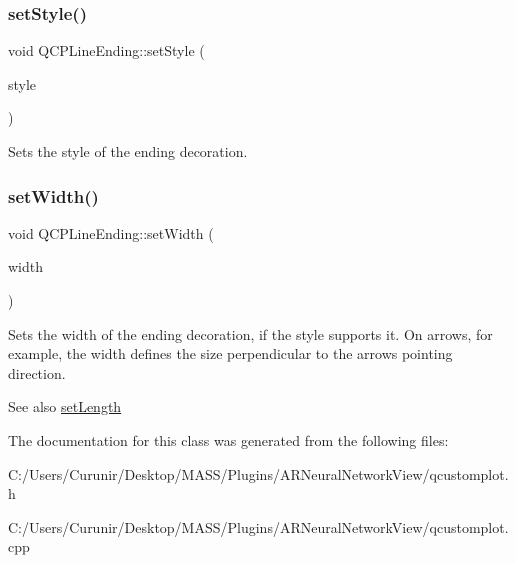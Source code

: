 \subsubsection{\texorpdfstring{set\+Style()}{setStyle()}}
{\footnotesize\ttfamily void Q\+C\+P\+Line\+Ending\+::set\+Style (\begin{DoxyParamCaption}\item[{\hyperlink{class_q_c_p_line_ending_a5ef16e6876b4b74959c7261d8d4c2cd5}{Q\+C\+P\+Line\+Ending\+::\+Ending\+Style}}]{style }\end{DoxyParamCaption})}

Sets the style of the ending decoration. \mbox{\label{class_q_c_p_line_ending_a26dc020ea985a72cc25881ce2115e34e}} 
\subsubsection{\texorpdfstring{set\+Width()}{setWidth()}}
{\footnotesize\ttfamily void Q\+C\+P\+Line\+Ending\+::set\+Width (\begin{DoxyParamCaption}\item[{double}]{width }\end{DoxyParamCaption})}

Sets the width of the ending decoration, if the style supports it. On arrows, for example, the width defines the size perpendicular to the arrow\textquotesingle{}s pointing direction.

\begin{DoxySeeAlso}{See also}
\hyperlink{class_q_c_p_line_ending_ae36fa01763751cd64b7f56c3507e935a}{set\+Length} 
\end{DoxySeeAlso}


The documentation for this class was generated from the following files\+:\begin{DoxyCompactItemize}
\item 
C\+:/\+Users/\+Curunir/\+Desktop/\+M\+A\+S\+S/\+Plugins/\+A\+R\+Neural\+Network\+View/qcustomplot.\+h\item 
C\+:/\+Users/\+Curunir/\+Desktop/\+M\+A\+S\+S/\+Plugins/\+A\+R\+Neural\+Network\+View/qcustomplot.\+cpp\end{DoxyCompactItemize}
